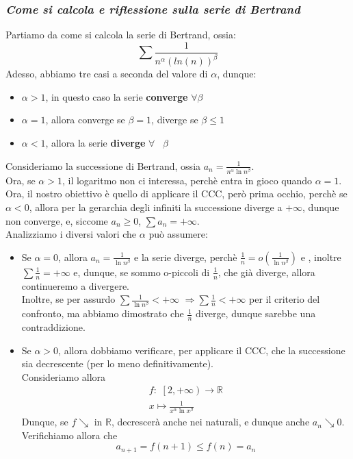 \documentclass{article}
\theoremstyle{definition}
\newcommand{\R}{\mathbb{R}}
\begin{document}
\subsubsection{\textbf{\textit{Come si calcola e riflessione sulla serie di Bertrand}}}
Partiamo da come si calcola la serie di Bertrand, ossia:
\begin{equation}
    \sum \frac{1}{n^\alpha (ln(n))^\beta}
\end{equation}
Adesso, abbiamo tre casi a seconda del valore di $\alpha$, dunque:
\begin{itemize}
    \item $\alpha > 1$, in questo caso la serie \textbf{converge} $\forall \beta$
    \item $\alpha =1$, allora converge se $\beta=1$, diverge se $\beta \leqslant 1$
    \item $\alpha < 1$, allora la serie \textbf{diverge} $\forall \,\,\,\,\, \beta$
\end{itemize}
Consideriamo la successione di Bertrand, ossia $a_n=\frac{1}{n^\alpha \ln{n}^\beta}$.
\\
Ora, se $\alpha > 1$, il logaritmo non ci interessa, perchè entra in gioco quando $\alpha=1$.
\\
Ora, il nostro obiettivo è quello di applicare il CCC, però prima occhio, perchè se $\alpha < 0$, allora per la gerarchia degli infiniti la successione diverge a $+\infty$, dunque non converge, e, siccome $a_n \geqslant 0$, $\sum a_n = +\infty$.
\\
Analizziamo i diversi valori che $\alpha$ può assumere:
\begin{itemize}
    \item Se $\alpha =0$, allora $a_n=\frac{1}{\ln{n}^\beta}$ e la serie diverge, perchè $\frac{1}{n}=o\left(\frac{1}{\ln{n}^\beta}\right)$ e , inoltre $\sum \frac{1}{n}=+\infty$ e, dunque, se sommo o-piccoli di $\frac{1}{n}$, che già diverge, allora continueremo a divergere.
    \\
    Inoltre, se per assurdo $\sum \frac{1}{\ln{n}^\beta} < +\infty \,\, \Longrightarrow \sum \frac{1}{n} < +\infty$ per il criterio del confronto, ma abbiamo dimostrato che $\frac{1}{n}$ diverge, dunque sarebbe una contraddizione.
    \item Se $\alpha > 0$, allora dobbiamo verificare, per applicare il CCC, che la successione sia decrescente (per lo meno definitivamente).
    \\
    Consideriamo allora
    \begin{align*}
        f: \,\, \left[2, +\infty \right) \to \R  \\
        x \mapsto \frac{1}{x^\alpha \ln{x}^\beta}
        \end{align*}
        Dunque, se $f \searrow$ in $\R$, decrescerà anche nei naturali, e dunque anche $a_n \searrow 0$.
        \\
        Verifichiamo allora che \begin{equation*}
            a_{n+1}=f(n+1) \leqslant f(n) = a_n
        \end{equation*}
\end{itemize}
\end{document}
